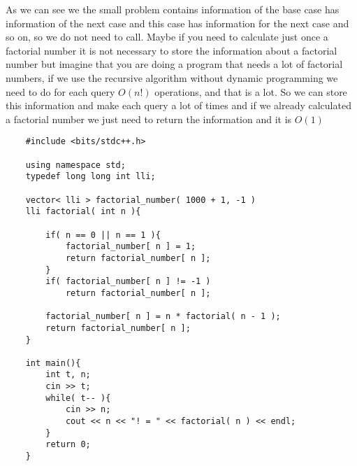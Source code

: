 \begin{figure}[H]
\begin{center}
\end{center}
\end{figure}

As we can see we the small problem contains information of the base case has information of the next case and this case has information for the next case and so on, so we do not need to call. Maybe if you need to calculate just once a factorial number it is not necessary to store the information about a factorial number but imagine that you are doing a program that needs a lot of factorial numbers, if we use the recursive algorithm without dynamic programming we need to do for each query $O(n!)$ operations, and that is a lot. So we can store this information and make each query a lot of times and if we already calculated a factorial number we just need to return the information and it is $O(1)$

\begin{lstlisting}
    #include <bits/stdc++.h>

    using namespace std;
    typedef long long int lli;

    vector< lli > factorial_number( 1000 + 1, -1 )
    lli factorial( int n ){

        if( n == 0 || n == 1 ){
            factorial_number[ n ] = 1;
            return factorial_number[ n ]; 
        }
        if( factorial_number[ n ] != -1 )
            return factorial_number[ n ];
        
        factorial_number[ n ] = n * factorial( n - 1 );
        return factorial_number[ n ];
    }

    int main(){
        int t, n;
        cin >> t;
        while( t-- ){
            cin >> n;
            cout << n << "! = " << factorial( n ) << endl;
        }
        return 0;  
    }
\end{lstlisting}

